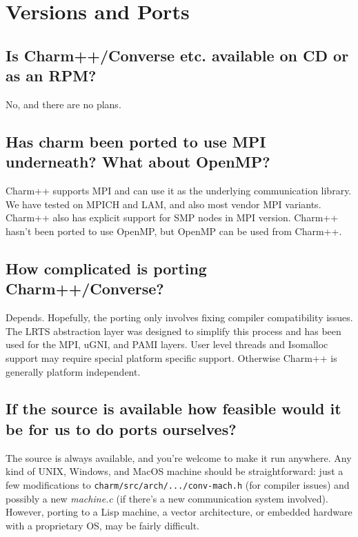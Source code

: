 \section{Versions and Ports}

\subsection{Is Charm++/Converse etc. available on CD or as an RPM?}

No, and there are no plans.

\subsection{Has charm been ported to use MPI underneath? What about OpenMP?}

Charm++ supports MPI and can use it as the underlying communication
library. We have tested on MPICH and LAM, and also most vendor MPI
variants.  Charm++ also has explicit support for SMP nodes in MPI
version. Charm++ hasn't been ported to use OpenMP, but OpenMP can be
used from Charm++.

\subsection{How complicated is porting Charm++/Converse?}

Depends. Hopefully, the porting only involves fixing compiler compatibility
issues.  The LRTS abstraction layer was designed to simplify this process and has been used for the MPI, uGNI, and PAMI layers.  User level threads and Isomalloc support may require special platform specific support.  Otherwise Charm++ is generally platform independent.

\subsection{If the source is available how feasible would it be for us to do ports
ourselves?}

The source is always available, and you're welcome to make it run anywhere.
Any kind of UNIX, Windows, and MacOS machine should be straightforward: just a
few modifications to {\tt charm/src/arch/.../conv-mach.h} (for compiler
issues) and possibly
a new {\em machine.c} (if there's a new communication system involved).
However, porting to a Lisp machine, a vector architecture, or embedded hardware with a proprietary OS, may be fairly difficult.

